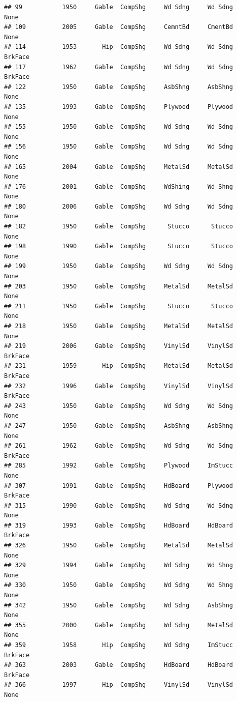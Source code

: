 \documentclass[]{article}
\begin{document}
\begin{verbatim}
## 99           1950     Gable  CompShg     Wd Sdng     Wd Sdng       None
## 109          2005     Gable  CompShg     CemntBd     CmentBd       None
## 114          1953       Hip  CompShg     Wd Sdng     Wd Sdng    BrkFace
## 117          1962     Gable  CompShg     Wd Sdng     Wd Sdng    BrkFace
## 122          1950     Gable  CompShg     AsbShng     AsbShng       None
## 135          1993     Gable  CompShg     Plywood     Plywood       None
## 155          1950     Gable  CompShg     Wd Sdng     Wd Sdng       None
## 156          1950     Gable  CompShg     Wd Sdng     Wd Sdng       None
## 165          2004     Gable  CompShg     MetalSd     MetalSd       None
## 176          2001     Gable  CompShg     WdShing     Wd Shng       None
## 180          2006     Gable  CompShg     Wd Sdng     Wd Sdng       None
## 182          1950     Gable  CompShg      Stucco      Stucco       None
## 198          1990     Gable  CompShg      Stucco      Stucco       None
## 199          1950     Gable  CompShg     Wd Sdng     Wd Sdng       None
## 203          1950     Gable  CompShg     MetalSd     MetalSd       None
## 211          1950     Gable  CompShg      Stucco      Stucco       None
## 218          1950     Gable  CompShg     MetalSd     MetalSd       None
## 219          2006     Gable  CompShg     VinylSd     VinylSd    BrkFace
## 231          1959       Hip  CompShg     MetalSd     MetalSd    BrkFace
## 232          1996     Gable  CompShg     VinylSd     VinylSd    BrkFace
## 243          1950     Gable  CompShg     Wd Sdng     Wd Sdng       None
## 247          1950     Gable  CompShg     AsbShng     AsbShng       None
## 261          1962     Gable  CompShg     Wd Sdng     Wd Sdng    BrkFace
## 285          1992     Gable  CompShg     Plywood     ImStucc       None
## 307          1991     Gable  CompShg     HdBoard     Plywood    BrkFace
## 315          1990     Gable  CompShg     Wd Sdng     Wd Sdng       None
## 319          1993     Gable  CompShg     HdBoard     HdBoard    BrkFace
## 326          1950     Gable  CompShg     MetalSd     MetalSd       None
## 329          1994     Gable  CompShg     Wd Sdng     Wd Shng       None
## 330          1950     Gable  CompShg     Wd Sdng     Wd Shng       None
## 342          1950     Gable  CompShg     Wd Sdng     AsbShng       None
## 355          2000     Gable  CompShg     Wd Sdng     MetalSd       None
## 359          1958       Hip  CompShg     Wd Sdng     ImStucc    BrkFace
## 363          2003     Gable  CompShg     HdBoard     HdBoard    BrkFace
## 366          1997       Hip  CompShg     VinylSd     VinylSd       None

\end{verbatim}
\end{document}
